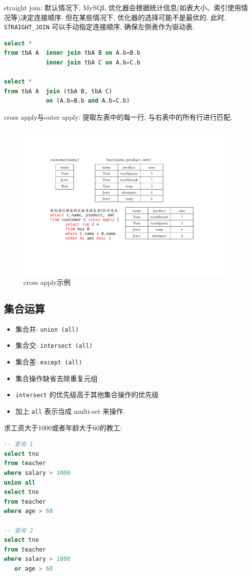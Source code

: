 straight join:
默认情况下, MySQL 优化器会根据统计信息(如表大小、索引使用情况等)决定连接顺序. 
但在某些情况下, 优化器的选择可能不是最优的. 
此时, \verb|STRAIGHT_JOIN| 可以手动指定连接顺序, 确保左侧表作为驱动表.

\begin{lstlisting}[language=SQL, caption={多表连接}]
select *
from tbA A  inner join tbA B on A.b=B.b
            inner join tbA C on A.b=C.b

select *
from tbA A  join (tbA B, tbA C)
            on (A.b=B.b and A.b=C.b)
\end{lstlisting}

cross apply与outer apply: 提取左表中的每一行, 与右表中的所有行进行匹配.
\begin{figure}[H]
    \centering
    \includegraphics[width=.8\textwidth]{figure/cross_apply.pdf}
    \caption{cross apply示例}
\end{figure}

\subsection{集合运算}

\begin{itemize}
  \item 集合并: \verb|union (all)|
  \item 集合交: \verb|intersect (all)|
  \item 集合差: \verb|except (all)|
  \item 集合操作缺省去除重复元组
  \item \verb|intersect| 的优先级高于其他集合操作的优先级
  \item 加上 \verb|all| 表示当成 multi-set 来操作.
\end{itemize}

求工资大于1000或者年龄大于60的教工:
\begin{lstlisting}[language=SQL, caption={集合操作表达查询的例子}]
-- 查询 1
select tno
from teacher
where salary > 1000
union all
select tno
from teacher
where age > 60

-- 查询 2
select tno
from teacher
where salary > 1000
   or age > 60
\end{lstlisting}

